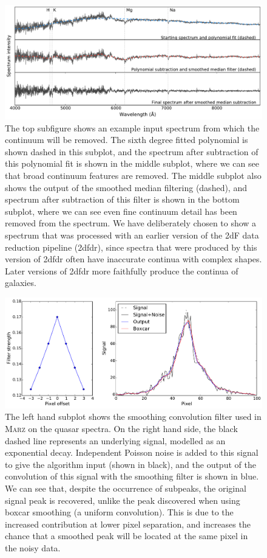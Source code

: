 \documentclass[5p]{elsarticle}
\newcommand{\marz}{\textsc{Marz}}
\begin{document}
\begin{figure}[t]
\centering
\includegraphics[width=\textwidth]{continuum.pdf}
\caption{The top subfigure shows an example input spectrum from which the continuum will be removed. The sixth degree fitted polynomial is shown dashed in this subplot, and the spectrum after subtraction of this polynomial fit is shown in the middle subplot, where we can see that broad continuum features are removed. The middle subplot also shows the output of the smoothed median filtering (dashed), and spectrum after subtraction of this filter is shown in the bottom subplot, where we can see even fine continuum detail has been removed from the spectrum. We have deliberately chosen to show a spectrum that was processed with an earlier version of the 2dF data reduction pipeline (2dfdr), since spectra that were produced by this version of 2dfdr often have inaccurate continua with complex shapes. Later versions of 2dfdr more faithfully produce the continua of galaxies.}
\label{fig:continuum}
\end{figure}


\begin{figure}[t]
\centering
\includegraphics[width=\textwidth]{rolling.pdf}
\caption{The left hand subplot shows the smoothing convolution filter used in \marz{} on the quasar spectra. On the right hand side, the black dashed line represents an underlying signal, modelled as an exponential decay. Independent Poisson noise is added to this signal to give the algorithm input (shown in black), and the output of the convolution of this signal with the smoothing filter is shown in blue. We can see that, despite the occurrence of subpeaks, the original signal peak is recovered, unlike the peak discovered when using boxcar smoothing (a uniform convolution). This is due to the increased contribution at lower pixel separation, and increases the chance that a smoothed peak will be located at the same pixel in the noisy data.}
\label{fig:rolling}
\end{figure}
\end{document}
